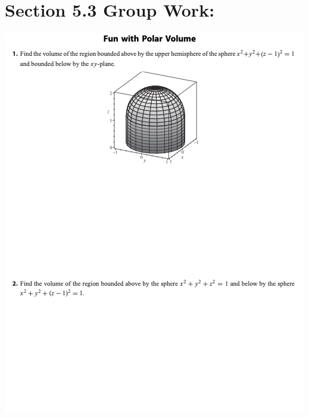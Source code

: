 \pagebreak

\section*{Section 5.3 Group Work:}

\includegraphics[height=.9\textheight]{Fun-with-Polar-Volume.png}

